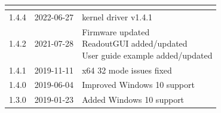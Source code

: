 \begin{tabularx}{\textwidth}{|c|c|X|}
{    }\\
    \hline
    {1.4.4} & 2022-06-27 &
        kernel driver v1.4.1\\
    \hline
    1.4.2 & 2021-07-28 &
    \makecell[l]{
        Firmware updated \\*
        ReadoutGUI added/updated \\*
        User guide example added/updated \\*
    }\\
    \hline
    {1.4.1} & 2019-11-11 & x64 32 mode issues fixed\\
    \hline
    {1.4.0} & 2019-06-04 & Improved Windows 10 support\\
    \hline
    {1.3.0} & 2019-01-23 & Added Windows 10 support\\
    \hline
\end{tabularx}